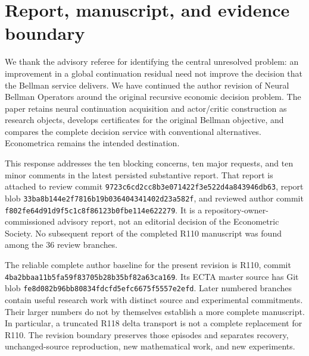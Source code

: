 \makeatletter
\providecommand{\NBOresponseResult}[2]{%
  \@ifundefined{r@#1}{\emph{#2}}{\emph{#2}~(\ref{#1})}}
\makeatother
\providecommand{\tightlist}{\setlength{\itemsep}{0pt}\setlength{\parskip}{0pt}}

\hypertarget{report-manuscript-and-evidence-boundary}{%
\section{Report, manuscript, and evidence boundary}\label{report-manuscript-and-evidence-boundary}}

We thank the advisory referee for identifying the central unresolved problem: an improvement in a global continuation residual need not improve the decision that the Bellman service delivers. We have continued the author revision of Neural Bellman Operators around the original recursive economic decision problem. The paper retains neural continuation acquisition and actor/critic construction as research objects, develops certificates for the original Bellman objective, and compares the complete decision service with conventional alternatives. Econometrica remains the intended destination.

This response addresses the ten blocking concerns, ten major requests, and ten minor comments in the latest persisted substantive report. That report is attached to review commit \nolinkurl{9723c6cd2cc8b3e071422f3e522d4a843946db63}, report blob \nolinkurl{33ba8b144e2f7816b19b036404341402d23a582f}, and reviewed author commit \nolinkurl{f802fe64d91d9f5c1c8f86123b0fbe114e622279}. It is a repository-owner-commissioned advisory report, not an editorial decision of the Econometric Society. No subsequent report of the completed R110 manuscript was found among the 36 review branches.

The reliable complete author baseline for the present revision is R110, commit \nolinkurl{4ba2bbaa11b5fa59f83705b28b35bf82a63ca169}. Its ECTA master source has Git blob \nolinkurl{fe8d082b96bb80834fdcfd5efc6675f5557e2efd}. Later numbered branches contain useful research work with distinct source and experimental commitments. Their larger numbers do not by themselves establish a more complete manuscript. In particular, a truncated R118 delta transport is not a complete replacement for R110. The revision boundary preserves those episodes and separates recovery, unchanged-source reproduction, new mathematical work, and new experiments.


